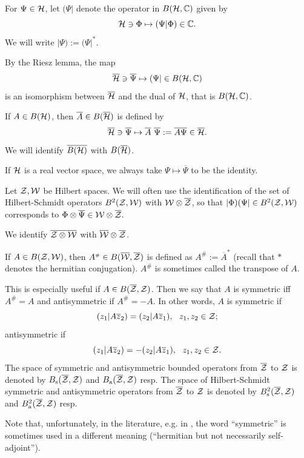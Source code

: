 \documentclass{svmult}
\def\ber{\begin{remark}}
\def\eer{\end{remark}}
\def\cc{{\mathbb C}}
\def\bar{\overline}
\def\s{{\rm s}}
\def\cZ{{\cal Z}}
\def\cB{{ B}}
\def\cW{{\cal W}}
\def\a{{\rm a}}
\def\cH{{\cal H}}
\def\cK{{\cal K}}
\def\cH{{\cal H}}
\def\s{{\rm s}}
\def\t{{\scriptscriptstyle\#}}
\begin{document}
For $\Psi\in\cH$, let $(\Psi|$ denote the operator in $B(\cH,\cc)$ given by
\[
\cH\ni\Phi\mapsto(\Psi|\Phi)\in\cc.\]
We will write $|\Psi):=(\Psi|^*$.

By the Riesz lemma,  the map 
\[\bar\cH\ni\bar\Psi\mapsto (\Psi|\in \cB(\cH,\cc) \]
is an  isomorphism between $\bar \cH$ and 
the dual of $\cH$, that is $\cB(\cH,\cc)$.





If $A\in \cB(\cH)$, then $\bar A\in \cB(\bar\cH)$ is defined by
\[\bar\cH\ni\bar\Psi\mapsto
\bar A\ \bar\Psi:=\bar{A\Psi}\in\bar\cH.\]
We will identify $\bar{B(\cH)}$ with $B(\bar\cH)$.

If $\cH$ is a real vector space, we always take $\Psi\mapsto\bar\Psi$ to be
the identity. 


Let $\cZ,\cW$ be Hilbert spaces.
We will often use the 
 identification of the set of Hilbert-Schmidt
operators $B^2(\cZ,\cW)$ with
$\cW\otimes\bar\cZ$, so that $|\Phi)(\Psi|\in B^2(\cZ,\cW)$
corresponds to $\Phi\otimes\bar{\Psi}\in\cW\otimes\bar\cZ.$

We
identify $\bar{\cZ\otimes\cW}$ with $\bar\cW\otimes\bar\cZ$.

If $A\in B(\cZ,\cW)$, then $A^\t\in B(\bar\cW,\bar\cZ)$ is defined as
$A^\t:={\bar A}^*$ (recall that
$*$ denotes the hermitian conjugation). $A^\t$ is
sometimes called the transpose of $A$.

 This is especially useful if $A\in B(\bar\cZ,\cZ)$. Then we
say that $A$ is symmetric iff $A^\t=A$ and antisymmetric if $A^\t=- A$.
In other words, $A$ is symmetric if
\[(z_1|A \bar z_2)=(z_2| A\bar z_1),\ \ z_1,z_2\in\cZ;\]
antisymmetric if
\[(z_1|A \bar z_2)=-(z_2| A\bar z_1),\ \ z_1,z_2\in\cZ.\]
The space of symmetric and antisymmetric bounded operators from $\bar\cZ$ to
$\cZ$ is denoted by $B_\s(\bar\cZ,\cZ)$ and $B_\a(\bar\cZ,\cZ)$ resp.
The space of Hilbert-Schmidt symmetric and antisymmetric operators from $\bar\cZ$
to $\cZ$ is denoted by $B_\s^2(\bar\cZ,\cZ)$ and $B_\a^2(\bar\cZ,\cZ)$ resp.


\ber Note that, unfortunately, in the literature, e.g. in \cite{RS1},
 the word ``symmetric'' is sometimes used in a
different meaning (``hermitian but not necessarily self-adjoint''). \eer
\end{document}
